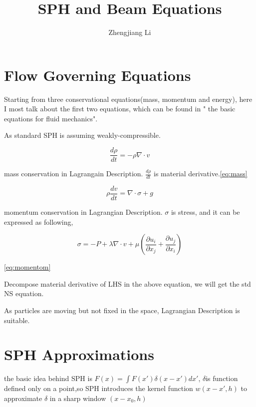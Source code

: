 \documentclass[11pt]{article}
\begin{document}
\title{SPH and Beam Equations}

\author{Zhengjiang Li}

\date{}

\maketitle

\section {Flow Governing Equations}

Starting from three conservational equations(mass, momentum and energy), here I most talk about the first two equations, which can be found in " the basic equations for fluid mechanics".

As standard SPH is assuming weakly-compressible. 

\begin{equation} \label{eq:mass}
	\frac{d \rho}{dt} = - \rho \nabla \cdot v
\end{equation}	

mass conservation in Lagrangain Description. $ \frac{d\rho }{dt}$ is material derivative.\ref{eq:mass}

\begin{equation} \label{eq:momentom}
	\rho \frac{dv}{dt} = \nabla \cdot \sigma + g
\end{equation}

momentum conservation in Lagrangian Description. $\sigma$ is stress, and it can be expressed as following,

$$ \sigma = -P + \lambda \nabla \cdot v + \mu (\frac{\partial u_i}{\partial x_j} +\frac{\partial u_j}{\partial x_i}) $$

\ref{eq:momentom}

Decompose material derivative of  LHS in the above equation, we will get the std NS equation.

As particles are moving but not fixed in the space, Lagrangian Description is suitable.

\section{SPH Approximations}

the basic idea behind SPH is  $ F(x) = \int F(x') \delta(x-x') dx' $, $\delta $is function defined only on a point,so SPH introduces the kernel function $w(x-x',h)$ to approximate $\delta$ in a sharp window $ (x-x_0, h)$
\end{document}
